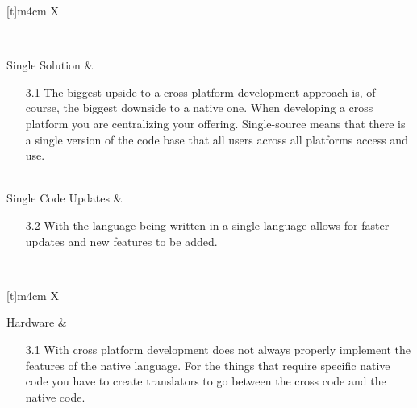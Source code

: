 \begin{center}
\begin{tabularx}{\textwidth}[t]{m{4cm} X}

\hline
{} \\
\hline

Single Solution &
\begin{minipage}[t]{\linewidth}%
\begin{itemize}
\item[3.1] The biggest upside to a cross platform development approach is, of course, the biggest
downside to a native one. When developing a cross platform you are centralizing your offering.
Single-source means that there is a single version of the code base that all users across all platforms
access and use.\\
\end{itemize} 
\end{minipage}\\

Single Code Updates &
\begin{minipage}[t]{\linewidth}%
\begin{itemize}
\item[3.2] With the language being written in a single language allows for faster updates and new
features to be added.  \\
\end{itemize} 
\end{minipage}\\

\end{tabularx}
\end{center}

\begin{center}
\begin{tabularx}{\textwidth}[t]{m{4cm} X}
\hline\hline
{} \\
\hline

Hardware &
\begin{minipage}[t]{\linewidth}%
\begin{itemize}
\item[3.1] With cross platform development does not always properly implement the features of the
native language. For the things that require specific native code you have to create translators to go
between the cross code and the native code.
\end{itemize} 
\end{minipage}\\

\end{tabularx}
\end{center}



